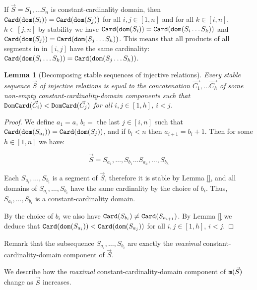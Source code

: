 \documentclass{lmcs}
\newtheorem{lemma}[theorem]{Lemma}
\begin{document}
If $\vec{S}=S_1, \ldots S_n$ is constant-cardinality domain, then ${\tt Card}({\tt dom}(S_i)) = {\tt Card}({\tt dom}(S_j))$ for all $i,j \in [1,n]$ and for all $k \in [i,n]$, $h \in [j,n]$ by
stability we have
${\tt Card}({\tt dom}(S_i)) ={\tt Card}({\tt dom}(S_i \ldots S_k))$ and
${\tt Card}({\tt dom}(S_j)) = {\tt Card}({\tt dom}(S_j \ldots S_h))$. This means that all products of
all segments in in $[i,j]$ have the same cardinality: 
${\tt Card}({\tt dom}(S_i \ldots S_k)) = {\tt Card}({\tt dom}(S_j \ldots S_h))$.

\begin{lemma}[Decomposing stable sequences of injective relations]
Every stable sequence $\vec{S}$ of injective relations is equal to the 
concatenation $\vec{C_1}, \ldots \vec{C_h}$
of some non-empty constant-cardinality-domain components 
such that ${\tt DomCard}(\vec{C_i})  < {\tt DomCard}(\vec{C_j})$ for all $i,j \in [1,h]$, $i < j$.
\end{lemma}

\begin{proof}
We define $a_1=a$, $b_i = $ the last $j \in [i,n]$ such that 
${\tt Card}({\tt dom}(S_{a_i})) = {\tt Card}({\tt dom}(S_j))$, and if $b_i<n$ then $a_{i+1}=b_i+1$.
Then for some $h \in [1,n]$ we have:

$$
\vec{S}
=
S_{a_1},\ldots,S_{b_1}
\ldots
S_{a_{h}},\ldots,S_{b_{h}}
$$

Each $S_{a_{i}},\ldots,S_{b_{i}}$ is a segment of $\vec{S}$, therefore it is stable
by Lemma \ref{}, and all domains of $S_{a_{i}},\ldots,S_{b_{i}}$ have the same cardinality 
by the choice of $b_i$. Thus, $S_{a_{i}},\ldots,S_{b_{i}}$ is a constant-cardinality domain. 

By the choice of $b_i$ we also have ${\tt Card}(S_{b_{i}}) \not = {\tt Card}(S_{a_{i+1}})$.
By Lemma \ref{} we deduce that
${\tt Card}({\tt dom}(S_{a_i})) < {\tt Card}({\tt dom}(S_{a_j}))$ for all $i,j \in [1,h]$, $i < j$.

\end{proof}

Remark that the subsequence $S_{a_{i}}, \ldots, S_{b_{i}}$ 
are exactly the \emph{maximal} constant-cardinality-domain component of $\vec{S}$.

We describe how the \emph{maximal} constant-cardinality-domain component of ${\tt m}(\vec{S})$ change as $\vec{S}$ increases.

\end{document}
